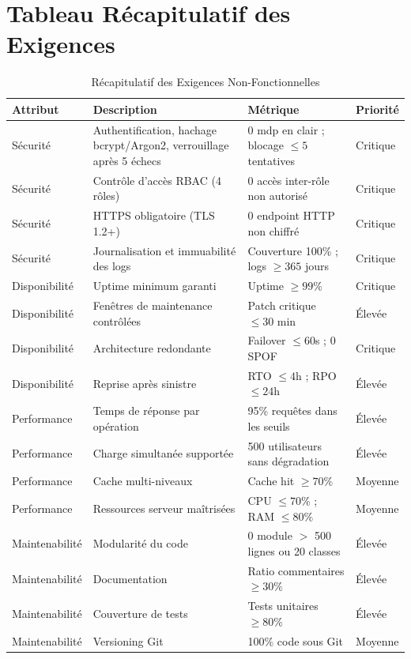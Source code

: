 \section{Tableau Récapitulatif des Exigences}


\begin{table}[H]
\centering
\caption{Récapitulatif des Exigences Non-Fonctionnelles}
\label{tab:nfr}
\small
\begin{tabularx}{\textwidth}{|l|X|X|l|}
\hline
\textbf{Attribut} & \textbf{Description}
& \textbf{Métrique} & \textbf{Priorité} \\
\hline

Sécurité
& Authentification, hachage bcrypt/Argon2, verrouillage après 5 échecs
& 0 mdp en clair ; blocage $\leq 5$ tentatives & Critique \\
\hline
Sécurité
& Contrôle d'accès RBAC (4 rôles)
& 0 accès inter-rôle non autorisé & Critique \\
\hline
Sécurité
& HTTPS obligatoire (TLS 1.2+)
& 0 endpoint HTTP non chiffré & Critique \\
\hline
Sécurité
& Journalisation et immuabilité des logs
& Couverture 100\% ; logs $\geq 365$ jours & Critique \\
\hline

Disponibilité
& Uptime minimum garanti
& Uptime $\geq 99\%$ & Critique \\
\hline
Disponibilité
& Fenêtres de maintenance contrôlées
& Patch critique $\leq 30$ min & Élevée \\
\hline
Disponibilité
& Architecture redondante
& Failover $\leq 60$s ; 0 SPOF & Critique \\
\hline
Disponibilité
& Reprise après sinistre
& RTO $\leq 4$h ; RPO $\leq 24$h & Élevée \\
\hline

Performance
& Temps de réponse par opération
& 95\% requêtes dans les seuils & Élevée \\
\hline
Performance
& Charge simultanée supportée
& 500 utilisateurs sans dégradation & Élevée \\
\hline
Performance
& Cache multi-niveaux
& Cache hit $\geq 70\%$ & Moyenne \\
\hline
Performance
& Ressources serveur maîtrisées
& CPU $\leq 70\%$ ; RAM $\leq 80\%$ & Moyenne \\
\hline

Maintenabilité
& Modularité du code
& 0 module $>$ 500 lignes ou 20 classes & Élevée \\
\hline
Maintenabilité
& Documentation
& Ratio commentaires $\geq 30\%$ & Élevée \\
\hline
Maintenabilité
& Couverture de tests
& Tests unitaires $\geq 80\%$ & Élevée \\
\hline
Maintenabilité
& Versioning Git
& 100\% code sous Git & Moyenne \\
\hline


\end{tabularx}
\end{table}
